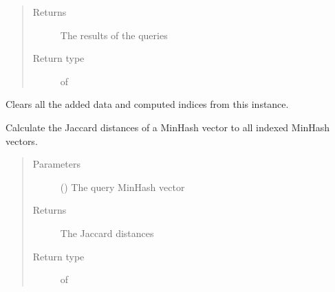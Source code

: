 \documentclass[letterpaper,10pt,english]{sphinxmanual}
\begin{document}
\begin{fulllineitems}
\begin{fulllineitems}
\begin{quote}
\begin{description}
\begin{itemize}
\end{itemize}

\item[{Returns}] \leavevmode
The results of the queries

\item[{Return type}] \leavevmode
{} of 

\end{description}\end{quote}

\end{fulllineitems}


\begin{fulllineitems}
\label{\detokenize{documentation:tmap.LSHForest.clear}}
Clears all the added data and computed indices from this {\hyperref[\detokenize{documentation:tmap.LSHForest}]{}} instance.

\end{fulllineitems}


\begin{fulllineitems}
\label{\detokenize{documentation:tmap.LSHForest.get_all_distances}}
Calculate the Jaccard distances of a MinHash vector to all indexed MinHash vectors.
\begin{quote}\begin{description}
\item[{Parameters}] \leavevmode
{} () \textendash{} The query MinHash vector

\item[{Returns}] \leavevmode
The Jaccard distances

\item[{Return type}] \leavevmode
{} of 

\end{description}\end{quote}


\end{fulllineitems}
\end{fulllineitems}
\end{document}
